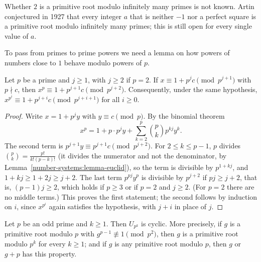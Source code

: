 \begin{remark}\label{number-theory:remark-artin}
Whether $2$ is a primitive root modulo infinitely many primes is not known. Artin conjectured in 1927 that every integer $a$ that is neither $-1$ nor a perfect square is a primitive root modulo infinitely
many primes; this is still open for every single value of $a$.
\end{remark}

To pass from primes to prime powers we need a lemma on how powers of numbers close to $1$ behave modulo powers of $p$.

\begin{lemma}\label{number-theory:lemma-lifting}
Let $p$ be a prime and $j \geq 1$, with $j \geq 2$ if $p = 2$. If $x \equiv 1 + p^jc \pmod{p^{j+1}}$ with $p \nmid c$, then $x^p \equiv 1 + p^{j+1}c \pmod{p^{j+2}}$. Consequently, under the same
hypothesis, $x^{p^i} \equiv 1 + p^{j+i}c \pmod{p^{j+i+1}}$ for all $i \geq 0$.
\end{lemma}

\begin{proof}
Write $x = 1 + p^jy$ with $y \equiv c \pmod p$. By the binomial theorem
\[
x^p = 1 + p \cdot p^jy + \sum_{k=2}^{p}\binom{p}{k}p^{kj}y^k .
\]
The second term is $p^{j+1}y \equiv p^{j+1}c \pmod{p^{j+2}}$. For $2 \leq k \leq p - 1$, $p$ divides $\binom{p}{k} = \frac{p!}{k!(p - k)!}$ (it divides the numerator and not the denominator, by
Lemma~\ref{number-systems:lemma-euclid}), so the term is divisible by $p^{1 + kj}$, and $1 + kj \geq 1 + 2j \geq j + 2$. The last term $p^{pj}y^p$ is divisible by $p^{j+2}$ if $pj \geq j + 2$, that is,
$(p - 1)j \geq 2$, which holds if $p \geq 3$ or if $p = 2$ and $j \geq 2$. (For $p = 2$ there are no middle terms.) This proves the first statement; the second follows by induction on $i$, since $x^{p^i}$
again satisfies the hypothesis, with $j + i$ in place of $j$.
\end{proof}

\begin{theorem}\label{number-theory:theorem-primitive-root-prime-power}
Let $p$ be an odd prime and $k \geq 1$. Then $U_{p^k}$ is cyclic. More precisely, if $g$ is a primitive root modulo $p$ with $g^{p-1} \not\equiv 1 \pmod{p^2}$, then $g$ is a primitive root modulo $p^k$
for every $k \geq 1$; and if $g$ is any primitive root modulo $p$, then $g$ or $g + p$ has this property.
\end{theorem}

